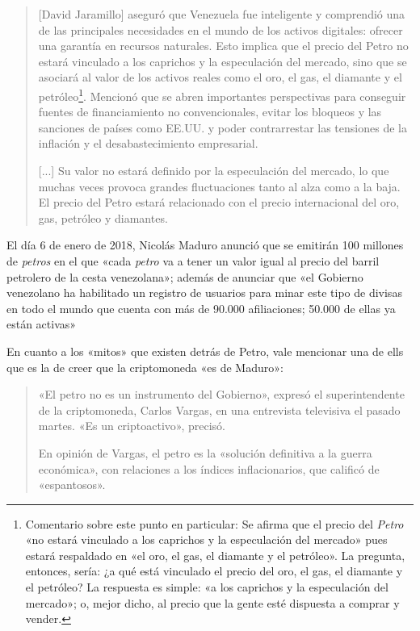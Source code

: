 \documentclass[12pt,a4paper,twoside]{book}
\begin{document}
\begin{quotation}
[David Jaramillo] aseguró que Venezuela fue inteligente y comprendió una de las principales necesidades en el mundo de los activos digitales: ofrecer una garantía en recursos naturales. Esto implica que el precio del Petro no estará vinculado a los caprichos y la especulación del mercado, sino que se asociará al valor de los activos reales como el oro, el gas, el diamante y el petróleo\footnote{Comentario sobre este punto en particular: Se afirma que el precio del \textit{Petro} «no estará vinculado a los caprichos y la especulación del mercado» pues estará respaldado en «el oro, el gas, el diamante y el petróleo». La pregunta, entonces, sería: ¿a qué está vinculado el precio del oro, el gas, el diamante y el petróleo? La respuesta es simple: «a los caprichos y la especulación del mercado»; o, mejor dicho, al precio que la gente esté dispuesta a comprar y vender.}. Mencionó que se abren importantes perspectivas para conseguir fuentes de financiamiento no convencionales, evitar los bloqueos y las sanciones de países como EE.UU. y poder contrarrestar las tensiones de la inflación y el desabastecimiento empresarial. 

[...] Su valor no estará definido por la especulación del mercado, lo que muchas veces provoca grandes fluctuaciones tanto al alza como a la baja. El precio del Petro estará relacionado con el precio internacional del oro, gas, petróleo y diamantes. \cite{petro:anuncio4}
\end{quotation}

El día 6 de enero de 2018, Nicolás Maduro anunció que se emitirán 100 millones de \textit{petros} en el que «cada \textit{petro} va a tener un valor igual al precio del barril petrolero de la cesta venezolana»; además de anunciar que «el Gobierno venezolano ha habilitado un registro de usuarios para minar este tipo de divisas en todo el mundo que cuenta con más de 90.000 afiliaciones; 50.000 de ellas ya están activas» \cite{petro:emision}

En cuanto a los «mitos» que existen detrás de Petro, vale mencionar una de ells que es la de creer que la criptomoneda «es de Maduro»:

\begin{quotation}
«El petro no es un instrumento del Gobierno», expresó el superintendente de la criptomoneda, Carlos Vargas, en una entrevista televisiva el pasado martes. «Es un criptoactivo», precisó.

En opinión de Vargas, el petro es la «solución definitiva a la guerra económica», con relaciones a los índices inflacionarios, que calificó de «espantosos». \cite{petro:mitos}
\end{quotation}
\end{document}
